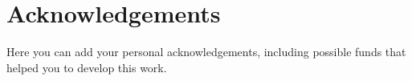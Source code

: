 \chapter*{Acknowledgements}

Here you can add your personal acknowledgements, including possible
funds that helped you to develop this work.
